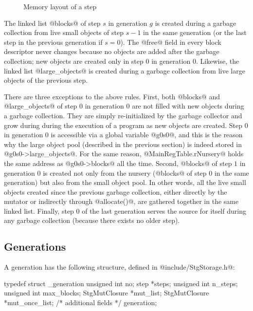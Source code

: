 \documentclass{article}
\begin{document}
\begin{figure}[ht]
\begin{center}

\caption{Memory layout of a step}
\label{fig-step}
\end{center}
\end{figure}

The linked list @blocks@ of step $s$ in generation $g$ is created 
during a garbage collection
from live small objects of step $s - 1$ in the same generation 
(or the last step in the previous generation if $s = 0$).
The @free@ field in every block descriptor never changes because
no objects are added after the garbage collection; new objects are created 
only in step $0$ in generation $0$.
Likewise, the linked list @large_objects@ is created during a
garbage collection from live large objects of the previous step. 

There are three exceptions to the above rules. 
First, both @blocks@ and @large_objects@ of
step $0$ in generation $0$ are not filled with new objects during a garbage 
collection. 
They are simply re-initialized by the garbage collector and 
grow during during the execution of a program as new objects are
created.
Step $0$ in generation $0$ is accessible via a global variable @g0s0@, 
and this is the reason why the large object pool (described in the previous 
section) is indeed stored in @g0s0->large_objects@. 
For the same reason, @MainRegTable.rNursery@ holds the same address as 
@g0s0->blocks@ all the time. 
Second, @blocks@ of step $1$ in generation $0$ is created not only from
the nursery (@blocks@ of step $0$ in the same generation) but also from the 
small object pool. In other words, all the live small objects created since
the previous garbage collection, either directly by the mutator or indirectly
through @allocate()@, are gathered together in the same linked list.
Finally, step $0$ of the last generation serves the source for itself during
any garbage collection (because there exists no older step).

\subsection{Generations}

A generation has the following structure, defined in 
@include/StgStorage.h@:

\begin{code}
typedef struct _generation {
  unsigned int no;
  step *steps;
  unsigned int n_steps;
  unsigned int max_blocks;
  StgMutClosure *mut_list;
  StgMutClosure *mut_once_list;
  /* additional fields */
} generation;
\end{code}
\end{document}
